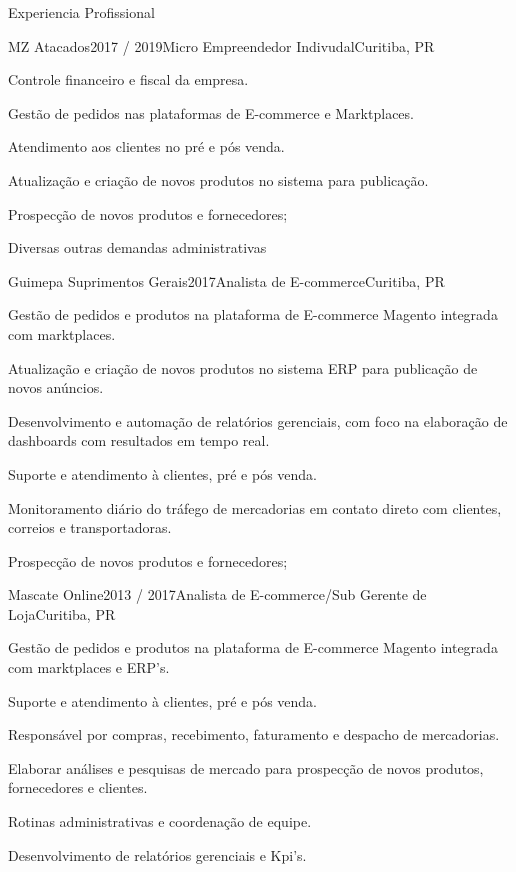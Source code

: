 \documentclass{resume} %
\begin{document}
\begin{rSection}{Experiencia Profissional}

\begin{rSubsection}{MZ Atacados}{2017 / 2019}{Micro Empreendedor Indivudal}{Curitiba, PR}
\item Controle financeiro e fiscal da empresa.
\item Gestão de pedidos nas plataformas de E-commerce e Marktplaces.
\item Atendimento aos clientes no pré e pós venda.
\item Atualização e criação de novos produtos no sistema para publicação.
\item Prospecção de novos produtos e fornecedores;
\item Diversas outras demandas administrativas
\end{rSubsection}


\begin{rSubsection}{Guimepa Suprimentos Gerais}{2017}{Analista de E-commerce}{Curitiba, PR}
\item Gestão de pedidos e produtos na plataforma de E-commerce Magento integrada com marktplaces.
\item Atualização e criação de novos produtos no sistema ERP para publicação de novos anúncios.
\item Desenvolvimento e automação de relatórios gerenciais, com foco na elaboração de dashboards com resultados em tempo real.
\item Suporte e atendimento à clientes, pré e pós venda.
\item Monitoramento diário do tráfego de mercadorias em contato direto com clientes, correios e transportadoras.
\item Prospecção de novos produtos e fornecedores;
\end{rSubsection}


\begin{rSubsection}{Mascate Online}{2013 / 2017}{Analista de E-commerce/Sub Gerente de Loja}{Curitiba, PR}
\item Gestão de pedidos e produtos na plataforma de E-commerce Magento integrada com marktplaces e ERP's.
\item Suporte e atendimento à clientes, pré e pós venda.
\item Responsável por compras, recebimento, faturamento e despacho de mercadorias.
\item Elaborar análises e pesquisas de mercado para prospecção de novos produtos, fornecedores e clientes. 
\item Rotinas administrativas e coordenação de equipe.
\item Desenvolvimento de relatórios gerenciais e Kpi's.
\end{rSubsection}


\end{rSection}
\end{document}

